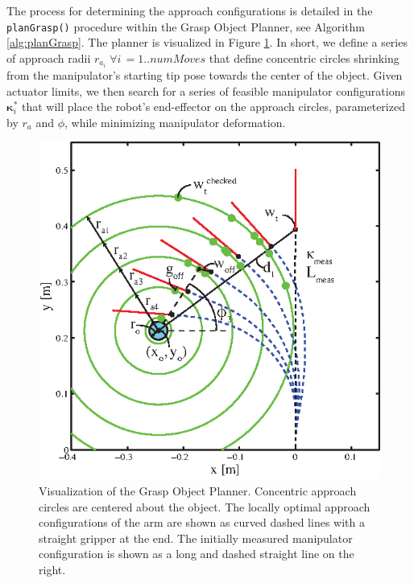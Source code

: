 The process for determining the approach configurations is detailed in the \texttt{planGrasp()} procedure within the Grasp Object Planner, see Algorithm \ref{alg:planGrasp}.
The planner is visualized in Figure \ref{fig:planGrasp}.
In short, we define a series of approach radii $r_{a_i} \;  \forall i\, = 1.. numMoves$ that define concentric circles shrinking from the manipulator's starting tip pose towards the center of the object.
Given actuator limits, we then search for a series of feasible manipulator configurations $\boldsymbol{\kappa}_i^*$ that will place the robot's end-effector on the approach circles, parameterized by $r_a$ and $\phi$, while minimizing manipulator deformation.

\begin{figure}[htpb]
\centering
   \includegraphics[width=0.85\columnwidth, trim = 0mm 0mm 5mm 5mm, clip]{Figures/processing_control/grasp_object_planner.eps}
   \caption{Visualization of the Grasp Object Planner. Concentric approach circles are centered about the object. The locally optimal approach configurations of the arm are shown as curved dashed lines with a straight gripper at the end. The initially measured manipulator configuration is shown as a long and dashed straight line on the right.}
   \label{fig:planGrasp}
\end{figure}


